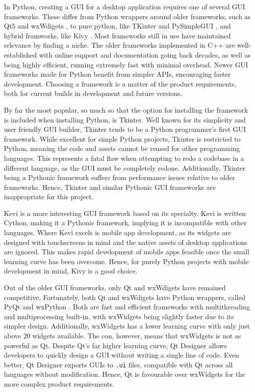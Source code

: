 \documentclass[11pt]{article}
\begin{document}
In Python, creating a GUI for a desktop application requires one of several GUI frameworks. These differ from Python wrappers around older frameworks, such as Qt5 and wxWdigets \cite{qt} \cite{wxwidgets}, to pure python, like TKinter and PySimpleGUI \cite{tkinter} \cite{pysimplegui}, and hybrid framworks, like Kivy \cite{kivy}. Most frameworks still in use have maintained relevance by finding a niche. The older frameworks implemented in C++ are well-established with online support and documentation going back decades, as well as being highly efficient, running extremely fast with minimal overhead. Newer GUI frameworks made for Python benefit from simpler APIs, encouraging faster development. Choosing a framework is a matter of the product requirements, both for current builds in development and future versions.

By far the most popular, so much so that the option for installing the framework is included when installing Python, is Tkinter. Well known for its simplicity and user friendly GUI builder, Tkinter tends to be a Python programmer's first GUI framework. While excellent for simple Python projects, Tkinter is restricted to Python, meaning the code and assets cannot be reused for other programming languages. This represents a fatal flaw when attempting to redo a codebase in a different language, as the GUI must be completely redone. Additionally, Tkinter being a Pythonic framework suffers from performance issues relative to older frameworks. Hence, Tkinter and similar Pythonic GUI frameworks are inappropriate for this project.

Kevi is a more interesting GUI framework based on its specialty. Kevi is written Cython, making it a Pythonic framework, implying it is incompatible with other languages. Where Kevi excels is mobile app development, as its widgets are designed with touchscreens in mind and the native assets of desktop applications are ignored. This makes rapid development of mobile apps feasible once the small learning curve has been overcome. Hence, for purely Python projects with mobile development in mind, Kivy is a good choice.

Out of the older GUI frameworks, only Qt and wxWdigets have remained competitive. Fortunately, both Qt and wxWdigets have Python wrappers, called PyQt and wxPython \cite{pyqt} \cite{wxpython}. Both are fast and efficient frameworks with multithreading and multiprocessing built-in, with wxWidgets being slightly faster due to its simpler design. Additionally, wxWidgets has a lower learning curve with only just above 20 widgets available. The con, however, means that wxWidgets is not as powerful as Qt. Despite Qt's far higher learning curve, Qt Designer allows developers to quickly design a GUI without writing a single line of code. Even better, Qt Designer exports GUIs to \texttt{.ui} files, compatible with Qt across all languages without modification. Hence, Qt is favourable over wxWidgets for the more complex product requirements.
\end{document}
